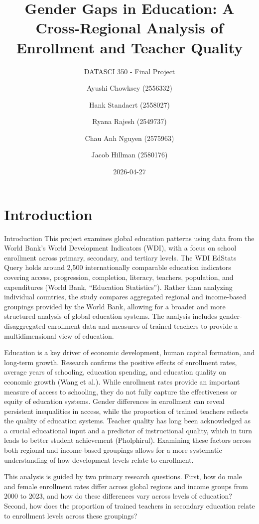 \documentclass[
  11pt,
]{article}
\title{Gender Gaps in Education: A Cross-Regional Analysis of Enrollment
and Teacher Quality}
\subtitle{DATASCI 350 - Final Project}
\author{Ayushi Chowksey (2556332) \and Hank Standaert
(2558027) \and Ryana Rajesh (2549737) \and Chau Anh Nguyen
(2575963) \and Jacob Hillman (2580176)}
\date{2026-04-27}
\begin{document}
\maketitle


\section{Introduction}\label{introduction}

Introduction This project examines global education patterns using data
from the World Bank's World Development Indicators (WDI), with a focus
on school enrollment across primary, secondary, and tertiary levels. The
WDI EdStats Query holds around 2,500 internationally comparable
education indicators covering access, progression, completion, literacy,
teachers, population, and expenditures (World Bank, ``Education
Statistics''). Rather than analyzing individual countries, the study
compares aggregated regional and income-based groupings provided by the
World Bank, allowing for a broader and more structured analysis of
global education systems. The analysis includes gender-disaggregated
enrollment data and measures of trained teachers to provide a
multidimensional view of education.

Education is a key driver of economic development, human capital
formation, and long-term growth. Research confirms the positive effects
of enrollment rates, average years of schooling, education spending, and
education quality on economic growth (Wang et al.). While enrollment
rates provide an important measure of access to schooling, they do not
fully capture the effectiveness or equity of education systems. Gender
differences in enrollment can reveal persistent inequalities in access,
while the proportion of trained teachers reflects the quality of
education systems. Teacher quality has long been acknowledged as a
crucial educational input and a predictor of instructional quality,
which in turn leads to better student achievement (Pholphirul).
Examining these factors across both regional and income-based groupings
allows for a more systematic understanding of how development levels
relate to enrollment.

This analysis is guided by two primary research questions. First, how do
male and female enrollment rates differ across global regions and income
groups from 2000 to 2023, and how do these differences vary across
levels of education? Second, how does the proportion of trained teachers
in secondary education relate to enrollment levels across these
groupings?
\end{document}
